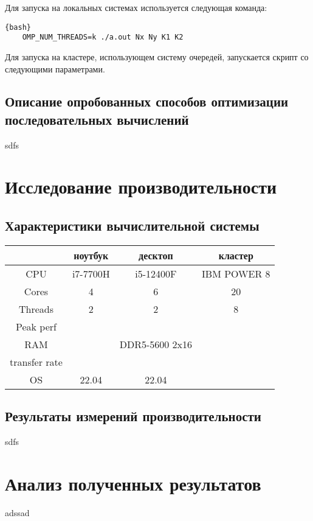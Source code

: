\documentclass[12pt, a4paper]{article}
\begin{document}
Для запуска на локальных системах используется следующая команда:

\begin{lstlisting}{bash}
	OMP_NUM_THREADS=k ./a.out Nx Ny K1 K2
\end{lstlisting}

Для запуска на кластере, использующем систему очередей, запускается скрипт со следующими параметрами.

\subsection{Описание опробованных способов оптимизации последовательных вычислений}

sdfs

\newpage

\section{Исследование производительности}

\subsection{Характеристики вычислительной системы}

\begin{center}
	\begin{tabular}{ c|c|c|c| } 
		 & ноутбук & десктоп & кластер \\ 
		\hline
		CPU & i7-7700H & i5-12400F & IBM POWER 8 \\ 
		Cores & 4 & 6 & 20 \\ 
		Threads & 2 & 2 & 8 \\
		Peak perf &  &  &  \\
		RAM &  & DDR5-5600 2x16 &  \\
		transfer rate &  &  &  \\
		OS & 22.04 & 22.04  &  \\
	\end{tabular}
\end{center}

\lstset{style=mystyle}

\subsection{Результаты измерений производительности}

sdfs

\newpage

\section{Анализ полученных результатов}

adssad
\end{document}

